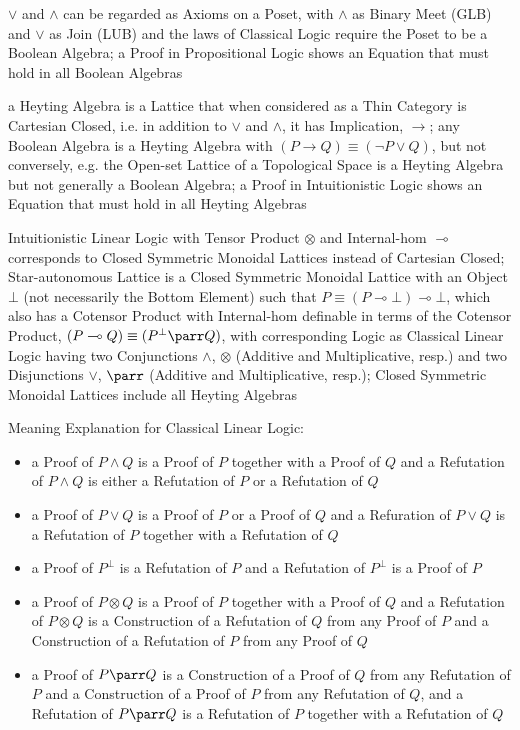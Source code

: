 $\vee$ and $\wedge$ can be regarded as Axioms on a Poset, with $\wedge$ as
Binary Meet (GLB) and $\vee$ as Join (LUB) and the laws of Classical Logic
require the Poset to be a Boolean Algebra; a Proof in Propositional Logic shows
an Equation that must hold in all Boolean Algebras

a Heyting Algebra is a Lattice that when considered as a Thin Category is
Cartesian Closed, i.e. in addition to $\vee$ and $\wedge$, it has Implication,
$\rightarrow$; any Boolean Algebra is a Heyting Algebra with $(P \rightarrow Q)
\equiv (\neg{P}\vee{Q})$, but not conversely, e.g. the Open-set Lattice of a
Topological Space is a Heyting Algebra but not generally a Boolean Algebra; a
Proof in Intuitionistic Logic shows an Equation that must hold in all Heyting
Algebras

Intuitionistic Linear Logic with Tensor Product $\otimes$ and Internal-hom
$\multimap$ corresponds to Closed Symmetric Monoidal Lattices instead of
Cartesian Closed; Star-autonomous Lattice is a Closed Symmetric Monoidal
Lattice with an Object $\bot$ (not necessarily the Bottom Element) such that $P
\equiv (P \multimap \bot) \multimap \bot$, which also has a Cotensor Product
with Internal-hom definable in terms of the Cotensor Product, $(P \multimap Q)
\equiv (P^\bot \parr Q)$, with corresponding Logic as Classical Linear Logic
having two Conjunctions $\wedge$, $\otimes$ (Additive and Multiplicative,
resp.) and two Disjunctions $\vee$, $\parr$ (Additive and Multiplicative,
resp.); Closed Symmetric Monoidal Lattices include all Heyting Algebras

Meaning Explanation for Classical Linear Logic:
\begin{itemize}
  \item a Proof of $P \wedge Q$ is a Proof of $P$ together with a Proof of $Q$
    and a Refutation of $P \wedge Q$ is either a Refutation of $P$ or a
    Refutation of $Q$
  \item a Proof of $P \vee Q$ is a Proof of $P$ or a Proof of $Q$ and a
    Refuration of $P \vee Q$ is a Refutation of $P$ together with a Refutation
    of $Q$
  \item a Proof of $P^\bot$ is a Refutation of $P$ and a Refutation of $P^\bot$
    is a Proof of $P$
  \item a Proof of $P \otimes Q$ is a Proof of $P$ together with a Proof of $Q$
    and a Refutation of $P \otimes Q$ is a Construction of a Refutation of $Q$
    from any Proof of $P$ and a Construction of a Refutation of $P$ from any
    Proof of $Q$
  \item a Proof of $P \parr Q$ is a Construction of a Proof of $Q$ from any
    Refutation of $P$ and a Construction of a Proof of $P$ from any Refutation
    of $Q$, and a Refutation of $P \parr Q$ is a Refutation of $P$ together
    with a Refutation of $Q$
\end{itemize}

